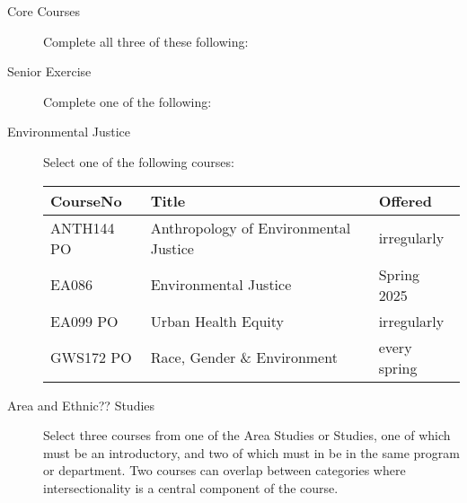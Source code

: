 \documentclass{article}\usepackage[]{graphicx}\usepackage[]{xcolor}
\newenvironment{itemize*}%
  {\begin{itemize}%
    \setlength{\itemsep}{0pt}%
    \setlength{\parskip}{0pt}}%
  {\end{itemize}}
\begin{document}
\begin{description}
  
 \item[Core Courses] Complete all three of these following:
  

  \item[Senior Exercise] Complete one of the following:
  


  \item[Environmental Justice] Select one of the following courses:
  
\begin{table}[ht]
\centering
\begin{tabular}{lll}
  \hline
CourseNo & Title & Offered \\ 
  \hline
ANTH144 PO & Anthropology of Environmental Justice & irregularly \\ 
  EA086 & Environmental Justice & Spring 2025 \\ 
  EA099 PO & Urban Health Equity & irregularly \\ 
  GWS172 PO & Race, Gender \& Environment & every spring \\ 
   \hline
\end{tabular}
\end{table}


  \item[Area and Ethnic?? Studies] Select three courses from one of the Area Studies or Studies, one of which must be an introductory, and two of which must in be in the same program or department. Two courses can overlap between categories where intersectionality is a central component of the course.
  

\end{description}
\end{document}
